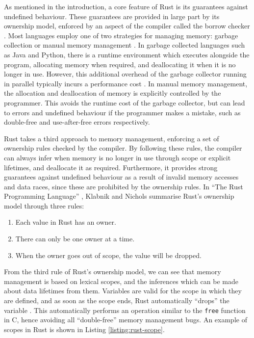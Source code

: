 As mentioned in the introduction, a core feature of Rust is its guarantees against undefined behaviour. These guarantees are provided in large part by its ownership model, enforced by an aspect of the compiler called the borrow checker \cite{ReferencesBorrowing}. Most languages employ one of two strategies for managing memory: garbage collection or manual memory management \cite{hertzQuantifyingPerformanceGarbage2005}. In garbage collected languages such as Java and Python, there is a runtime environment which executes alongside the program, allocating memory when required, and deallocating it when it is no longer in use. However, this additional overhead of the garbage collector running in parallel typically incurs a performance cost  \cite{hertzQuantifyingPerformanceGarbage2005}. In manual memory management, the allocation and deallocation of memory is explicitly controlled by the programmer. This avoids the runtime cost of the garbage collector, but can lead to errors and undefined behaviour if the programmer makes a mistake, such as double-free and use-after-free errors respectively.

Rust takes a third approach to memory management, enforcing a set of ownership rules checked by the compiler. By following these rules, the compiler can always infer when memory is no longer in use through scope or explicit lifetimes, and deallocate it as required. Furthermore, it provides strong guarantees against undefined behaviour as a result of invalid memory accesses and data races, since these are prohibited by the ownership rules. In ``The Rust Programming Language'' \cite{RustProgrammingLanguage}, Klabnik and Nichols summarise Rust's ownership model through three rules:


\begin{quotebox}
    \begin{enumerate}
        \item Each value in Rust has an owner.
        \item There can only be one owner at a time.
        \item When the owner goes out of scope, the value will be dropped.
    \end{enumerate}
\end{quotebox}


From the third rule of Rust's ownership model, we can see that memory management is based on lexical scopes, and the inferences which can be made about data lifetimes from them. Variables are valid for the scope in which they are defined, and as soon as the scope ends, Rust automatically ``drops'' the variable \cite{sautterOBSERVINGPARALLELEXECUTION}. This automatically performs an operation similar to the \texttt{free} function in C, hence avoiding all ``double-free'' memory management bugs. An example of scopes in Rust is shown in Listing \ref{listing:rust-scope}.

